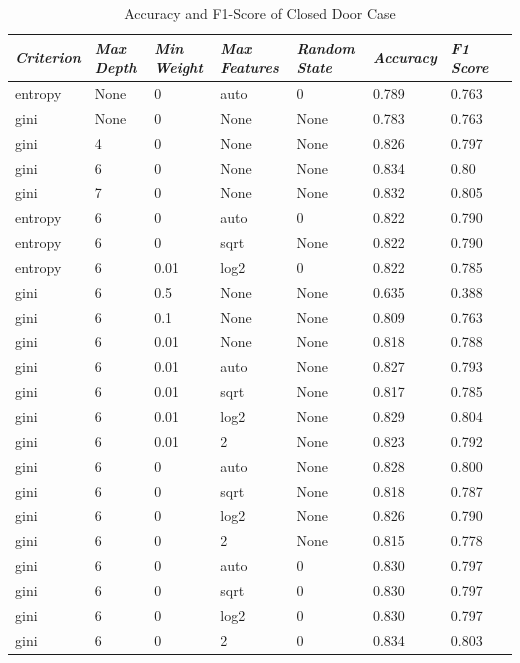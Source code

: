 \documentclass[conference]{IEEEtran}
\begin{document}
\begin{table}[H]
	\centering
	\caption{Accuracy and F1-Score of Closed Door Case}
	\label{AllArches}
	\begin{tabular}{|p{1cm}|p{0.7cm}|p{0.7cm}|p{0.7cm}|p{1cm}|p{1cm}|p{1cm}|p{1cm}|}
	    \hline
		\textit{Criterion} 
		& \textit{Max Depth}
		& \textit{Min Weight}
		& \textit{Max Features}
		& \textit{Random State}
		& \textit{Accuracy}
		& \textit{F1 Score}\\ \hline
		entropy & None & 0 & auto & 0 & 0.789 & 0.763\\ \hline
		gini & None & 0 & None & None & 0.783 & 0.763\\ \hline
		gini & 4 & 0 & None & None & 0.826 & 0.797\\ \hline
		gini & 6 & 0 & None & None & 0.834 & 0.80\\ \hline
		gini & 7 & 0 & None & None & 0.832 & 0.805\\ \hline
		entropy & 6 & 0 & auto & 0 & 0.822 & 0.790\\ \hline
        entropy & 6 & 0 & sqrt & None & 0.822 & 0.790\\ \hline
        entropy & 6 & 0.01 & log2 & 0 & 0.822 & 0.785\\ \hline
		gini & 6 & 0.5 & None & None & 0.635 & 0.388\\ \hline
        gini & 6 & 0.1 & None & None & 0.809 & 0.763\\ \hline
        gini & 6 & 0.01 & None & None & 0.818 & 0.788\\ \hline
        gini & 6 & 0.01 & auto & None & 0.827 & 0.793\\ \hline
        gini & 6 & 0.01 & sqrt & None & 0.817 & 0.785\\ \hline
        gini & 6 & 0.01 & log2 & None & 0.829 & 0.804\\ \hline
        gini & 6 & 0.01 & 2 & None & 0.823 & 0.792\\ \hline
        gini & 6 & 0 & auto & None & 0.828 & 0.800\\ \hline
        gini & 6 & 0 & sqrt & None & 0.818 & 0.787\\ \hline
        gini & 6 & 0 & log2 & None & 0.826 & 0.790\\ \hline
        gini & 6 & 0 & 2 & None & 0.815 & 0.778\\ \hline
        gini & 6 & 0 & auto & 0 & 0.830 & 0.797\\ \hline
        gini & 6 & 0 & sqrt & 0 & 0.830 & 0.797\\ \hline
        gini & 6 & 0 & log2 & 0 & 0.830 & 0.797\\ \hline
        gini & 6 & 0 & 2 & 0 & \cellcolor{green!25}0.834 & 0.803\\ \hline
	\end{tabular}
\end{table}
\end{document}

